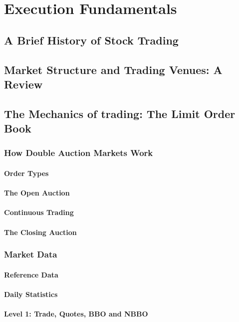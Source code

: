 
\chapter{Execution Fundamentals}
\section{A Brief History of Stock Trading}
\section{Market Structure and Trading Venues: A Review}
\section{The Mechanics of trading: The Limit Order Book}
\subsection{How Double Auction Markets Work}
\subsubsection{Order Types}
\subsubsection{The Open Auction}
\subsubsection{Continuous Trading}
\subsubsection{The Closing Auction}
\subsection{Market Data}
\subsubsection{Reference Data}
\subsubsection{Daily Statistics}
\subsubsection{Level 1: Trade, Quotes, BBO and NBBO}
